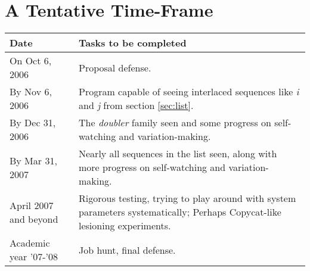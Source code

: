 \documentclass[letterpaper]{article}
\begin{document}
\section{A Tentative Time-Frame}
\begin{tabular}{l|p{4in}}
 \textbf{Date} & \textbf{Tasks to be completed}\\ \hline
On Oct 6, 2006 & Proposal defense. \\
By Nov 6, 2006 & Program capable of seeing interlaced sequences like \emph{i} and \emph{j} from section \ref{sec:list}.\\
By Dec 31, 2006 & The \emph{doubler} family seen and some progress on self-watching and variation-making.\\
By Mar 31, 2007 & Nearly all sequences in the list seen, along with more  progress on self-watching and variation-making.\\
April 2007 and beyond & Rigorous testing, trying to play around with system parameters systematically; Perhaps Copycat-like lesioning experiments.\\
Academic year '07-'08 & Job hunt, final defense.\\
\hline 
\end{tabular}


\printindex
\end{document}
